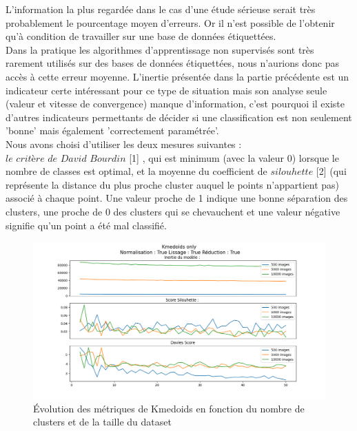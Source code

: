 \documentclass{article}
\begin{document}
L'information la plus regardée dans le cas d'une étude sérieuse serait très probablement le pourcentage moyen d'erreurs. Or il n'est possible de l'obtenir qu'à condition de travailler sur une base de données étiquettées.  \\

Dans la pratique les algorithmes d'apprentissage non supervisés sont très rarement utilisés sur des bases de données étiquettées, nous n'aurions donc pas accès à cette erreur moyenne. L'inertie  présentée dans la partie précédente est un indicateur certe intéressant pour ce type de situation mais son analyse seule (valeur et vitesse de convergence) manque d'information, c'est pourquoi il existe d'autres indicateurs permettants de décider si une classification est non seulement 'bonne' mais également 'correctement paramétrée'.  \\

Nous avons choisi d'utiliser les deux mesures suivantes : $\textit{le critère de David Bourdin}$ [1] , qui est minimum (avec la valeur 0) lorsque le nombre de classes est optimal, et la moyenne du coefficient de $silouhette$ [2] (qui représente la distance du plus proche cluster auquel le points n'appartient pas) associé à chaque point. Une valeur proche de 1 indique une bonne séparation des clusters, une proche de 0 des clusters qui se chevauchent  et une valeur négative signifie qu'un point a été mal classifié.

\begin{figure}[H]
    \centering
    \includegraphics[width=\textwidth]{"./Images/Kmedoids_no_prepo.png"}
    \caption{Évolution des métriques de Kmedoids en fonction du nombre de clusters et de la taille du dataset}
    \label{fig:my_label}
\end{figure}
\end{document}
